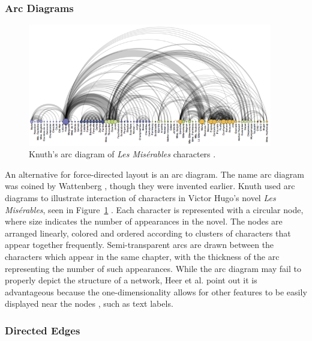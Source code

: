 \subsubsection{Arc Diagrams}

\begin{figure}[h]
	\centering
	\includegraphics[width=0.95\textwidth]{figures/png/arcdiagram.png}
	\caption{Knuth's arc diagram of \textit{Les Mis\'erables} characters \cite{knuth1993}.}
	\label{fig:arcdiagram}
\end{figure}

An alternative for force-directed layout is an arc diagram.  The name arc diagram was coined by Wattenberg \citeyearpar{wattenberg2002}, though they were invented earlier.  Knuth used arc diagrams to illustrate interaction of characters in Victor Hugo's novel \textit{Les} \textit{Mis\'erables}, seen in Figure~\ref{fig:arcdiagram} \citeyearpar{knuth1993}.  Each character is represented with a circular node, where size indicates the number of appearances in the novel.  The nodes are arranged linearly, colored and ordered according to clusters of characters that appear together frequently.  Semi-transparent arcs are drawn between the characters which appear in the same chapter, with the thickness of the arc representing the number of such appearances.  While the arc diagram may fail to properly depict the structure of a network, Heer et al. point out it is advantageous because the one-dimensionality allows for other features to be easily displayed near the nodes \citeyearpar{heer2010}, such as text labels.

\subsubsection{Directed Edges}

